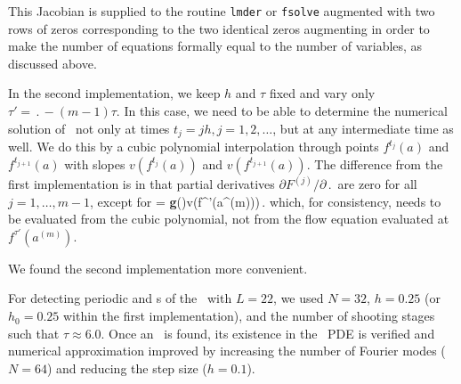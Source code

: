 This Jacobian is supplied to the routine {\tt lmder} or {\tt fsolve}
augmented with two rows of zeros corresponding to the two identical
zeros augmenting  in order to make the number of
equations formally equal to the number of variables,
as discussed above.

In the second implementation, we keep $h$ and $\tau$ fixed and vary
only $\tau' = \period{} - (m-1)\tau$.  In this case, we need to be
able to determine the numerical solution of \KSe\ not only at times
$t_j = jh, j = 1, 2, \ldots$, but at any intermediate time as well.
We do this by a cubic polynomial interpolation through points
$f^{t_j}(a)$ and $f^{t_{j+1}}(a)$ with slopes $v(f^{t_j}(a))$ and
$v(f^{t_{j+1}}(a))$.  The difference from the first implementation
is in that partial derivatives $\partial F^{(j)}/\partial \period{}$
are zero for all $j = 1,\ldots,m-1$, except for
\beq
   =
  {\bf g}(\shift)v(f^{\tau'}(a^{(m)}))\,.
\eeq
which, for consistency, needs to be evaluated from the cubic
polynomial, not from the flow equation evaluated
at $f^{\tau'}(a^{(m)})$.

We found the second implementation more convenient.

For detecting periodic and \rpo s of the \KSe\ with $L = 22$, we used
$N = 32$, $h = 0.25$ (or $h_0 = 0.25$ within the first implementation),
and the number of shooting stages such that $\tau \approx 6.0$.
Once an \rpo\ is found, its existence in the \KS\ PDE is verified
and numerical approximation improved by increasing the number of
Fourier modes ($N = 64$) and reducing the step size ($h = 0.1$).
